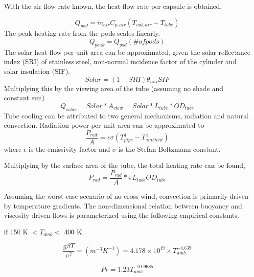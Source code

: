 \documentclass[heading.tex]{subfiles}
\begin{document}
With the air flow rate known, the heat flow rate per capsule is obtained,

\begin{equation*}
{Q}_{pod}= \dot{m}_{air} C_{p,air} (T_{out, air} - T_{tube})
\end{equation*}
The peak heating rate from the pods scales linearly.
\begin{equation*}
{Q}_{peak}= Q_{pod} (\# ofpods)
\end{equation*}
The solar heat flow per unit area can be approximated, given the solar reflectance index (SRI) of stainless steel, non-normal incidence factor
of the cylinder and solar insulation (SIF).
\begin{equation*}
Solar = (1-SRI) {\theta}_{nni} SIF
\end{equation*}
Multiplying this by the viewing area of the tube (assuming no shade and constant sun)
\begin{equation*}
Q_{solar} = Solar * A_{view} = Solar * L_{tube} * OD_{tube}
\end{equation*}
Tube cooling can be attributed to two general mechanisms, radiation and natural convection. Radiation power per unit area can be
approximated to
\begin{equation*}
\frac{P_{rad}}{A} = \epsilon \sigma (T_{pipe}^4 - T_{ambient}^4)
\end{equation*}
where  $\epsilon$ is the emissivity factor and  $\sigma$ is the Stefan-Boltzmann constant.

Multiplying by the surface area of the tube, the total heating rate can be found,
\begin{equation*}
P_{rad} =  \frac{P_{rad}}{A} * \pi L_{tube} OD_{tube}
\end{equation*}

Assuming the worst case scenario of no cross wind, convection is primarily driven by temperature gradients. The non-dimensional relation
between buoyancy and viscosity driven flows is parameterized using the following empirical constants. \cite{Berton} \cite{Incropera}

if 150 K $<  T_{amb} <$ 400 K:

\begin{equation*}
\frac{g \beta T} {\upsilon^2} = (m^{-3}K^{-1}) = 4.178\times10^{19} \times T_{amb}^{-4.639}
\end{equation*}

\begin{equation*}
Pr = 1.23 T_{amb}^{-0.09685}
\end{equation*}
\end{document}
